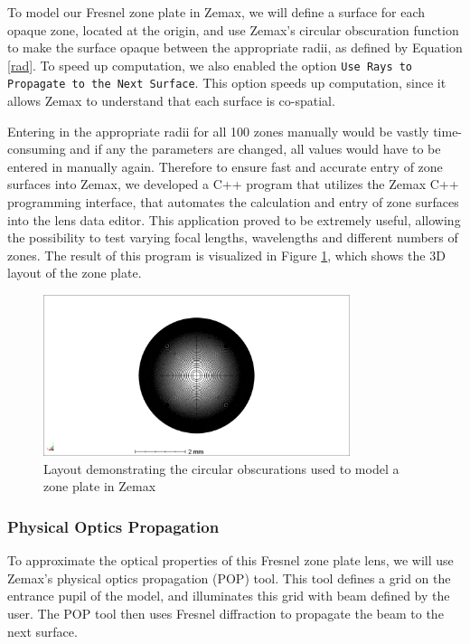 \documentclass[10pt,letterpaper]{article}
\begin{document}
				To model our Fresnel zone plate in Zemax, we will define a surface for each opaque zone, located at the origin, and use Zemax's circular obscuration function to make the surface opaque between the appropriate radii, as defined by Equation \ref{rad}. To speed up computation, we also enabled the option \texttt{Use Rays to Propagate to the Next Surface}. This option speeds up computation, since it allows Zemax to understand that each surface is co-spatial.
				
				Entering in the appropriate radii for all 100 zones manually would be vastly time-consuming and if any the parameters are changed, all values would have to be entered in manually again. Therefore to ensure fast and accurate entry of zone surfaces into Zemax, we developed a C++ program that utilizes the Zemax C++ programming interface, that automates the calculation and entry of zone surfaces into the lens data editor. This application proved to be extremely useful, allowing the possibility to test varying focal lengths, wavelengths and different numbers of zones. The result of this program is visualized in Figure \ref{layout}, which shows the 3D layout of the zone plate.
			
				\begin{figure}[h!]
					\centering
					\includegraphics[width=0.8\textwidth]{figures/I90}
					\caption{Layout demonstrating the circular obscurations used to model a zone plate in Zemax}
					\label{layout}
				\end{figure}
			
			\subsubsection{Physical Optics Propagation}
			
				To approximate the optical properties of this Fresnel zone plate lens, we will use Zemax's physical optics propagation (POP) tool. This tool defines a grid on the entrance pupil of the model, and illuminates this grid with beam defined by the user. The POP tool then uses Fresnel diffraction to propagate the beam to the next surface.
				
\end{document}
